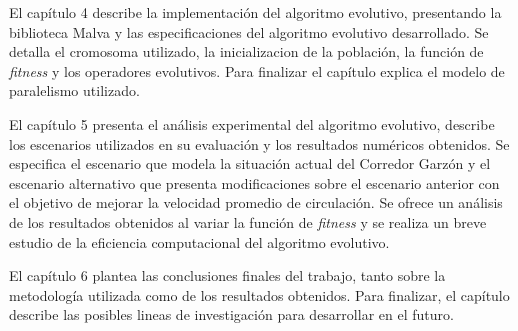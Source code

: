 El capítulo 4 describe la implementación del algoritmo evolutivo, presentando la biblioteca Malva y las especificaciones del algoritmo evolutivo desarrollado. Se detalla el cromosoma utilizado, la inicializacion de la población, la función de \emph{fitness} y los operadores evolutivos. Para finalizar el capítulo explica el modelo de paralelismo utilizado.


El capítulo 5 presenta el análisis experimental del algoritmo evolutivo, describe los escenarios utilizados en su evaluación y los resultados numéricos obtenidos. Se especifica el escenario que modela la situación actual del Corredor Garzón y el escenario alternativo que presenta modificaciones sobre el escenario anterior con el objetivo de mejorar la velocidad promedio de circulación. Se ofrece un análisis de los resultados obtenidos al variar la función de \emph{fitness} y se realiza un breve estudio de la eficiencia computacional del algoritmo evolutivo.

El capítulo 6 plantea las conclusiones finales del trabajo, tanto sobre la metodología utilizada como de los resultados obtenidos. Para finalizar, el capítulo describe las posibles lineas de investigación para desarrollar en el futuro.






